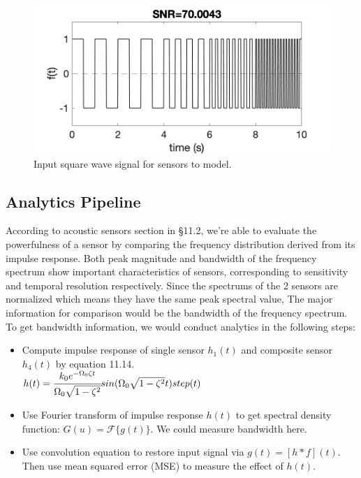 \documentclass[12pt,a4paper,twocolumn]{article}
\begin{document}
\begin{figure}[!ht]
    \includegraphics[width=\columnwidth]{lab2_sig.png}
    \caption{Input square wave signal for sensors to model.}
    \label{fig:2}
\end{figure}

\subsection{Analytics Pipeline}{\label{ap}}
According to acoustic sensors section in \S 11.2\cite{insana2020biomedical}, we're able to evaluate the powerfulness of a sensor by comparing the frequency distribution derived from its impulse response. Both peak magnitude and bandwidth of the frequency spectrum show important characteristics of sensors, corresponding to sensitivity and temporal resolution respectively. Since the spectrums of the 2 sensors are normalized which means they have the same peak spectral value, The major information for comparison would be the bandwidth of the frequency spectrum. To get bandwidth information, we would conduct analytics in the following steps: 
\begin{itemize}
    \item Compute impulse response of single sensor $h_1(t)$ and composite sensor $h_4(t)$ by equation 11.14\cite{insana2020biomedical}. \\
    $h(t)=\cfrac{k_0e^{-\Omega_0\zeta t}}{\Omega_0\sqrt{1-\zeta^2}}sin(\Omega_0\sqrt{1-\zeta^2}t)step(t)$
    \item Use Fourier transform of impulse response $h(t)$ to get spectral density function: $G(u)=\mathcal{F}\{g(t)\}$. We could measure bandwidth here. 
    \item Use convolution equation to restore input signal via $g(t)=[h*f](t)$. Then use mean squared error (MSE) to measure the effect of $h(t)$. 
\end{itemize}
\end{document}
